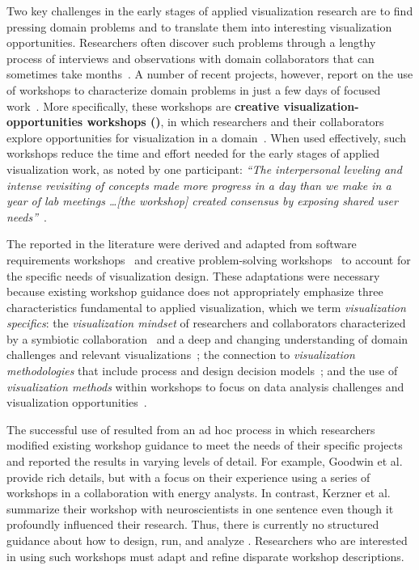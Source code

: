 Two key challenges in the early stages of applied visualization research are to find pressing domain problems and to translate them into interesting visualization opportunities. Researchers often discover such problems through a lengthy process of interviews and observations with domain collaborators that can sometimes take months~\cite{Lam2012,McKenna2014,Sedlmair2012}. A number of recent projects, however, report on the use of workshops to characterize domain problems in just a few days of focused work~\cite{Dykes2010,Goodwin2013,Goodwin2016,Kerzner2017,Nobre2017,Walker2013}. More specifically, these workshops are {\bf creative visualization-opportunities workshops (\workshops)}, in which researchers and their collaborators explore opportunities for visualization in a domain~\cite{Goodwin2013}. When used effectively, such workshops reduce the time and effort needed for the early stages of applied visualization work, as noted by one participant: \emph{``The interpersonal leveling and intense revisiting of concepts made more progress in a day than we make in a year of lab meetings \ldots [the workshop] created consensus by exposing shared user needs''}~\cite{Kerzner2017}.

The \workshops reported in the literature were derived and adapted from software requirements workshops~\cite{Jones2007} and creative problem-solving workshops~\cite{CreativeEducationFoundation2015} to account for the specific needs of visualization design. These adaptations were necessary because existing workshop guidance does not appropriately emphasize three characteristics fundamental to applied visualization, which we term {\it visualization specifics}: the {\it visualization mindset} of researchers and collaborators characterized by a symbiotic collaboration~\cite{Sedlmair2012} and a deep and changing understanding of domain challenges and relevant visualizations~\cite{McCurdy2016a}; the connection to {\it visualization methodologies} that include process and design decision models~\cite{Munzner2009,Sedlmair2012}; and the use of {\it visualization methods} within workshops to focus on data analysis challenges and visualization opportunities~\cite{Goodwin2013}. 

The successful use of \workshops resulted from an ad hoc process in which researchers modified existing workshop guidance to meet the needs of their specific projects and reported the results in varying levels of detail. For example, Goodwin et al.~\cite{Goodwin2013} provide rich details, but with a focus on their experience using a series of workshops in a collaboration with energy analysts. In contrast, Kerzner et al.~\cite{Kerzner2017} summarize their workshop with neuroscientists in one sentence even though it profoundly influenced their research. Thus, there is currently no structured guidance about how to design, run, and analyze \workshops. Researchers who are interested in using such workshops must adapt and refine disparate workshop descriptions.

